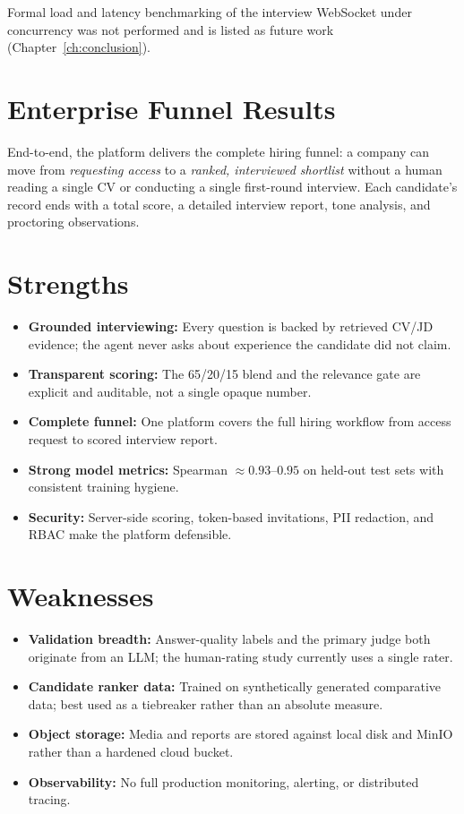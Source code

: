 \documentclass[12pt,a4paper,oneside]{report}
\begin{document}
Formal load and latency benchmarking of the interview WebSocket under concurrency was not
performed and is listed as future work (Chapter~\ref{ch:conclusion}).

\section{Enterprise Funnel Results}

End-to-end, the platform delivers the complete hiring funnel: a company can move from
\textit{requesting access} to a \textit{ranked, interviewed shortlist} without a human reading
a single CV or conducting a single first-round interview. Each candidate's record ends with a
total score, a detailed interview report, tone analysis, and proctoring observations.

\section{Strengths}

\begin{itemize}
  \item \textbf{Grounded interviewing:} Every question is backed by retrieved CV/JD evidence;
    the agent never asks about experience the candidate did not claim.
  \item \textbf{Transparent scoring:} The 65/20/15 blend and the relevance gate are explicit
    and auditable, not a single opaque number.
  \item \textbf{Complete funnel:} One platform covers the full hiring workflow from access
    request to scored interview report.
  \item \textbf{Strong model metrics:} Spearman $\approx 0.93$--$0.95$ on held-out test sets
    with consistent training hygiene.
  \item \textbf{Security:} Server-side scoring, token-based invitations, PII redaction, and
    RBAC make the platform defensible.
\end{itemize}

\section{Weaknesses}

\begin{itemize}
  \item \textbf{Validation breadth:} Answer-quality labels and the primary judge both originate
    from an LLM; the human-rating study currently uses a single rater.
  \item \textbf{Candidate ranker data:} Trained on synthetically generated comparative data;
    best used as a tiebreaker rather than an absolute measure.
  \item \textbf{Object storage:} Media and reports are stored against local disk and MinIO
    rather than a hardened cloud bucket.
  \item \textbf{Observability:} No full production monitoring, alerting, or distributed tracing.
\end{itemize}
\end{document}
